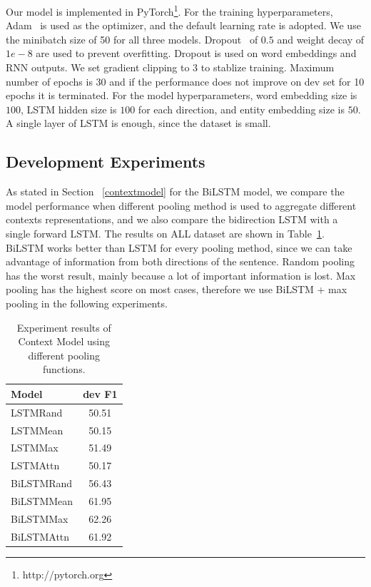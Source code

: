 \documentclass[letterpaper]{article}
\begin{document}
Our model is implemented in PyTorch\footnote{http://pytorch.org}. For the training hyperparameters, Adam~\cite{kingma2014adam} is used as the optimizer, and the default learning rate is adopted. We use the minibatch size of 50 for all three models. Dropout~\cite{hinton2012improving} of $0.5$ and weight decay of $1e-8$ are used to prevent overfitting. Dropout is used on word embeddings and RNN outputs. We set gradient clipping to 3 to stablize training. Maximum number of epochs is 30 and if the performance does not improve on dev set for 10 epochs it is terminated. For the model hyperparameters, word embedding size is $100$, LSTM hidden size is $100$ for each direction, and entity embedding size is $50$. A single layer of LSTM is enough, since the dataset is small.

\subsection{Development Experiments}

As stated in Section ~\ref{contextmodel} for the BiLSTM model, we compare the model performance when different pooling method is used to aggregate different contexts representations, and we also compare the bidirection LSTM with a single forward LSTM. The results on ALL dataset are shown in Table~\ref{table:BoEresult}. BiLSTM works better than LSTM for every pooling method, since we can take advantage of information from both directions of the sentence. Random pooling has the worst result, mainly because a lot of important information is lost. Max pooling has the highest score on most cases, therefore we use BiLSTM + max pooling in the following experiments.

\begin{table}[t!]
\centering
\begin{tabular}{l c}
\hline 
{\bf Model} & {\bf dev F1 }\\ 
\hline\hline
LSTMRand & 50.51 \\
LSTMMean & 50.15 \\
LSTMMax & 51.49 \\
LSTMAttn & 50.17 \\ 
\hline
BiLSTMRand & 56.43 \\
BiLSTMMean & 61.95 \\
BiLSTMMax  & 62.26 \\
BiLSTMAttn & 61.92 \\ 
\hline
\end{tabular}
\caption{Experiment results of Context Model using different pooling functions.}
\label{table:BoEresult}
\end{table}
\end{document}
